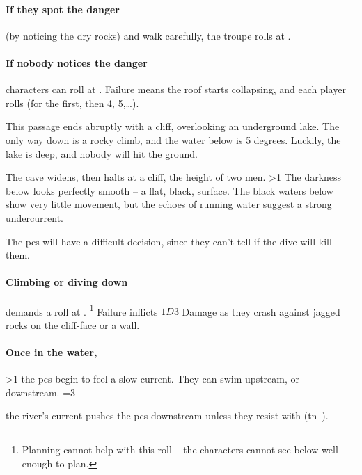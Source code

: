 \begin{multicols}{2}
\paragraph{If they spot the danger}
(by noticing the dry rocks) and walk carefully, the troupe rolls  at \tn[7].

\paragraph{If nobody notices the danger}
characters can roll  at \tn[10].
Failure means the roof starts collapsing, and each player rolls  (\tn[3] for the first, then 4, 5,\ldots).




This passage ends abruptly with a cliff, overlooking an underground lake.
The only way down is a rocky climb, and the water below is 5 degrees.
Luckily, the lake is deep, and nobody will hit the ground.

\begin{boxtext}
  The cave widens, then halts at a cliff, the height of two men.
  \ifnum\value{temperature}>1%
    The darkness below looks perfectly smooth -- a flat, black, surface.
  \else%
    The black waters below show very little movement, but the echoes of running water suggest a strong undercurrent.
  \fi%
\end{boxtext}

The \glspl{pc} will have a difficult decision, since they can't tell if the dive will kill them.

\paragraph{Climbing or diving down}
demands a  roll at \tn[8].%
\footnote{Planning cannot help with this roll -- the characters cannot see below well enough to plan.}
Failure inflicts $1D3$ Damage as they crash against jagged rocks on the cliff-face or a wall.

\paragraph{Once in the water,}
\ifnum\value{temperature}>1%
  the \glspl{pc} begin to feel a slow current.
  They can swim upstream, or downstream.
\else%
  \ifnum\value{temperature}=3%
    \addtocounter{track}{2}%
  \fi%
  the river's current pushes the \glspl{pc} downstream unless they resist with  (\gls{tn}~).
\fi%


\end{multicols}
